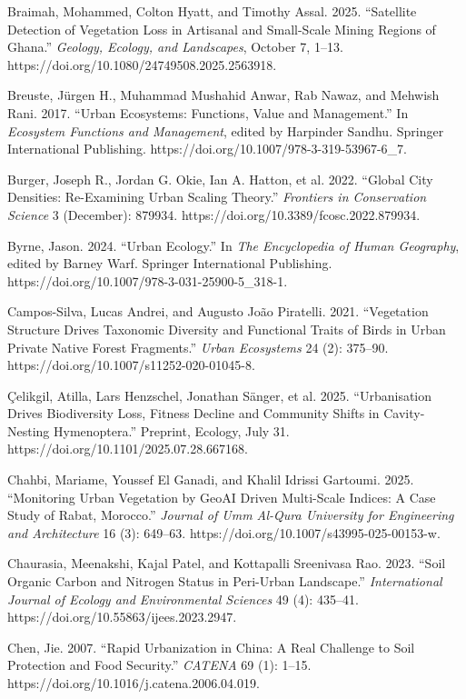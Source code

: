Braimah, Mohammed, Colton Hyatt, and Timothy Assal. 2025. ``Satellite Detection of Vegetation Loss in Artisanal and Small-Scale Mining Regions of Ghana.'' \emph{Geology, Ecology, and Landscapes}, October 7, 1--13. https://doi.org/10.1080/24749508.2025.2563918.

Breuste, Jürgen H., Muhammad Mushahid Anwar, Rab Nawaz, and Mehwish Rani. 2017. ``Urban Ecosystems: Functions, Value and Management.'' In \emph{Ecosystem Functions and Management}, edited by Harpinder Sandhu. Springer International Publishing. https://doi.org/10.1007/978-3-319-53967-6\_7.

Burger, Joseph R., Jordan G. Okie, Ian A. Hatton, et al. 2022. ``Global City Densities: Re-Examining Urban Scaling Theory.'' \emph{Frontiers in Conservation Science} 3 (December): 879934. https://doi.org/10.3389/fcosc.2022.879934.

Byrne, Jason. 2024. ``Urban Ecology.'' In \emph{The Encyclopedia of Human Geography}, edited by Barney Warf. Springer International Publishing. https://doi.org/10.1007/978-3-031-25900-5\_318-1.

Campos-Silva, Lucas Andrei, and Augusto João Piratelli. 2021. ``Vegetation Structure Drives Taxonomic Diversity and Functional Traits of Birds in Urban Private Native Forest Fragments.'' \emph{Urban Ecosystems} 24 (2): 375--90. https://doi.org/10.1007/s11252-020-01045-8.

Çelikgil, Atilla, Lars Henzschel, Jonathan Sänger, et al. 2025. ``Urbanisation Drives Biodiversity Loss, Fitness Decline and Community Shifts in Cavity-Nesting Hymenoptera.'' Preprint, Ecology, July 31. https://doi.org/10.1101/2025.07.28.667168.

Chahbi, Mariame, Youssef El Ganadi, and Khalil Idrissi Gartoumi. 2025. ``Monitoring Urban Vegetation by GeoAI Driven Multi-Scale Indices: A Case Study of Rabat, Morocco.'' \emph{Journal of Umm Al-Qura University for Engineering and Architecture} 16 (3): 649--63. https://doi.org/10.1007/s43995-025-00153-w.

Chaurasia, Meenakshi, Kajal Patel, and Kottapalli Sreenivasa Rao. 2023. ``Soil Organic Carbon and Nitrogen Status in Peri-Urban Landscape.'' \emph{International Journal of Ecology and Environmental Sciences} 49 (4): 435--41. https://doi.org/10.55863/ijees.2023.2947.

Chen, Jie. 2007. ``Rapid Urbanization in China: A Real Challenge to Soil Protection and Food Security.'' \emph{CATENA} 69 (1): 1--15. https://doi.org/10.1016/j.catena.2006.04.019.

